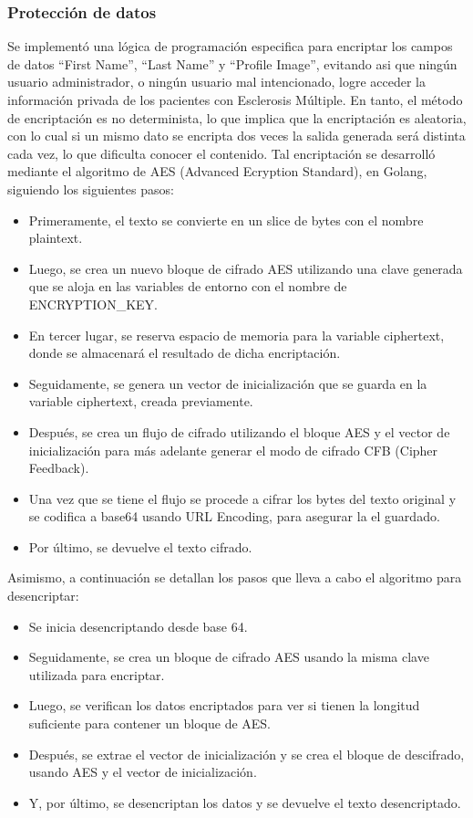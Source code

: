 \subsubsection{Protección de datos}

Se implementó una lógica de programación especifica para encriptar los campos de datos “First Name”, “Last Name” y “Profile Image”, evitando asi que ningún usuario administrador, o ningún usuario mal intencionado, logre acceder la información privada de los pacientes con Esclerosis Múltiple. En tanto, el método de encriptación es no determinista, lo que implica que la encriptación es aleatoria, con lo cual si un mismo dato se encripta dos veces la salida generada será distinta cada vez,  lo que dificulta conocer el contenido. Tal encriptación se desarrolló mediante el algoritmo de AES (Advanced Ecryption Standard), en Golang, siguiendo los siguientes pasos:

\begin{itemize}
\tightlist
\item
Primeramente, el texto se convierte en un slice de bytes con el nombre plaintext.

\item Luego, se crea un nuevo bloque de cifrado AES utilizando una clave generada que se aloja en las variables de entorno con el nombre de ENCRYPTION\_KEY.
\item En tercer lugar, se reserva espacio de memoria para la variable ciphertext, donde se almacenará el resultado de dicha encriptación.
\item Seguidamente, se genera un vector de inicialización que se guarda en la variable ciphertext, creada previamente.
\item Después, se crea un flujo de cifrado utilizando el bloque AES y el vector de inicialización para más adelante generar el modo de cifrado CFB (Cipher Feedback).
\item Una vez que se tiene el flujo se procede a cifrar los bytes del texto original y se codifica a base64 usando URL Encoding, para asegurar la el guardado.
\item 
Por último, se devuelve el texto cifrado. 
\end{itemize}

Asimismo, a continuación se detallan los pasos que lleva a cabo el algoritmo para desencriptar:

\begin{itemize}
\tightlist
\item
 Se inicia desencriptando desde base 64.
\item Seguidamente, se crea un bloque de cifrado AES usando la misma clave utilizada para encriptar.
\item Luego, se verifican los datos encriptados para ver si tienen la longitud suficiente para contener un bloque de AES.
\item Después, se extrae el vector de inicialización y se crea el bloque de descifrado, usando AES y el vector de inicialización.
\item Y, por último, se desencriptan los datos y se devuelve el texto desencriptado.
\end{itemize}